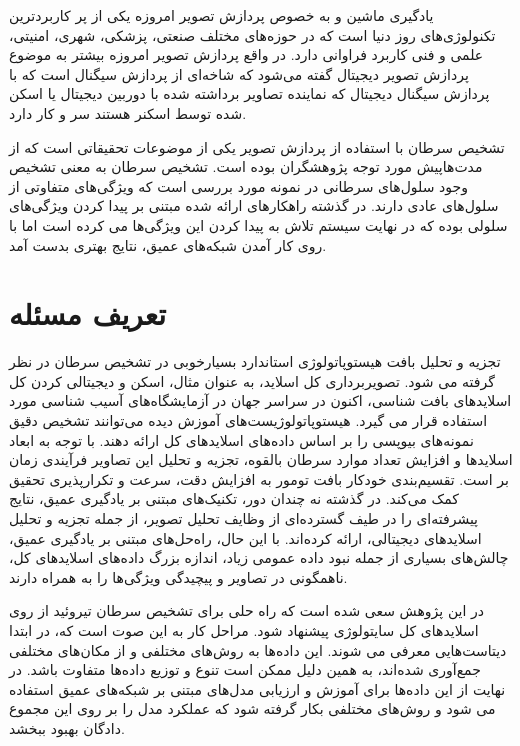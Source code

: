 
یادگیری ماشین و به خصوص پردازش تصویر امروزه یکی از پر کاربردترین تکنولوژی‌های روز دنیا است که در حوزه‌های مختلف صنعتی، پزشکی، شهری، امنیتی، علمی و فنی کاربرد فراوانی دارد.
در واقع پردازش تصویر امروزه بیشتر به موضوع پردازش تصویر دیجیتال گفته می‌شود که شاخه‌ای از پردازش سیگنال است که با پردازش سیگنال دیجیتال که نماینده تصاویر برداشته شده با دوربین دیجیتال یا اسکن شده توسط اسکنر هستند سر و کار دارد.

تشخیص سرطان با استفاده از پردازش تصویر یکی از موضوعات تحقیقاتی است که از مدت‌هاپیش مورد توجه پژوهشگران بوده است. تشخیص سرطان به معنی تشخیص وجود سلول‌های سرطانی در نمونه مورد بررسی است که ویژگی‌های متفاوتی از سلول‌های عادی دارند. در گذشته راهکارهای ارائه شده مبتنی بر پیدا کردن ویژگی‌های سلولی بوده که در نهایت سیستم تلاش به پیدا کردن این ویژگی‌ها می کرده است اما با روی کار آمدن شبکه‌های عمیق، نتایج بهتری بدست آمد.

\section{تعریف مسئله}\label{sec:تعریف-مسئله}
تجزیه و تحلیل بافت هیستوپاتولوژی استاندارد بسیارخوبی در تشخیص سرطان در نظر گرفته می شود. تصویربرداری کل اسلاید، به عنوان مثال، اسکن و دیجیتالی کردن کل اسلایدهای بافت شناسی، اکنون در سراسر جهان در آزمایشگاه‌های آسیب شناسی مورد استفاده قرار می گیرد. هیستوپاتولوژیست‌های آموزش دیده می‌توانند تشخیص دقیق نمونه‌های بیوپسی را بر اساس داده‌های اسلاید‌های کل ارائه دهند. با توجه به ابعاد اسلاید‌ها و افزایش تعداد موارد سرطان بالقوه، تجزیه و تحلیل این تصاویر فرآیندی زمان بر است. تقسیم‌بندی خودکار بافت تومور به افزایش دقت، سرعت و تکرارپذیری تحقیق کمک می‌کند. در گذشته نه چندان دور، تکنیک‌های مبتنی بر یادگیری عمیق، نتایج پیشرفته‌ای را در طیف گسترده‌ای از وظایف تحلیل تصویر، از جمله تجزیه و تحلیل اسلایدهای دیجیتالی، ارائه کرده‌اند. با این حال، راه‌حل‌های مبتنی بر یادگیری عمیق، چالش‌های بسیاری از جمله نبود داده عمومی زیاد، اندازه بزرگ داده‌های اسلاید‌های کل، ناهمگونی در تصاویر و پیچیدگی ویژگی‌ها را به همراه دارند.

در این پژوهش سعی شده است که راه حلی برای تشخیص سرطان تیروئید از روی اسلاید‌های کل سایتولوژی پیشنهاد شود.
مراحل کار به این صوت است که، در ابتدا دیتاست‌هایی معرفی می شوند. این داده‌ها به روش‌های مختلفی و از مکان‌های مختلفی جمع‌آوری شده‌اند، به همین دلیل ممکن است تنوع و توزیع داده‌ها متفاوت باشد.
در نهایت از این داده‌ها برای آموزش و ارزیابی مدل‌های مبتنی بر شبکه‌های عمیق استفاده می شود و روش‌های مختلفی بکار گرفته شود که عملکرد مدل را بر روی این مجموع دادگان بهبود ببخشد.

